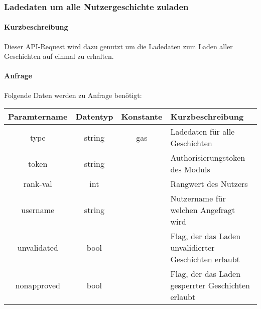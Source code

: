 \subsubsection{Ladedaten um alle Nutzergeschichte zuladen}
\paragraph{Kurzbeschreibung}Dieser API-Request wird dazu genutzt um die Ladedaten zum Laden aller Geschichten auf einmal zu erhalten.
\paragraph{Anfrage}Folgende Daten werden zu Anfrage benötigt:
\begin{table}[H]
	\begin{tabular}{|c|c|c|p{6.5cm}|}
		\hline
		\textbf{Paramtername} & \textbf{Datentyp} & \textbf{Konstante} & \textbf{Kurzbeschreibung}                                                                                               \\ \hline
		type                & string            & gas                & Ladedaten für alle Geschichten \\ \hline
		token               & string            &                    & Authorisierungstoken des Moduls \\ \hline
		rank-val            & int               &                    & Rangwert des Nutzers \\ \hline
		username            & string            &                    & Nutzername für welchen Angefragt wird \\ \hline
		unvalidated         & bool              &                    & Flag, der das Laden unvalidierter Geschichten erlaubt \\ \hline
		nonapproved         & bool              &                    & Flag, der das Laden gesperrter Geschichten erlaubt \\ \hline
	\end{tabular}
\end{table}

